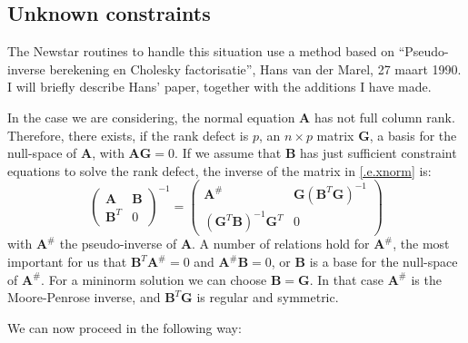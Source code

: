 \subsection{Unknown constraints}

The Newstar routines to handle this situation use a method based on
``Pseudo-inverse berekening en Cholesky factorisatie'', Hans van der Marel,
27 maart 1990. I will briefly describe Hans' paper, together with the
additions I have made.

In the case we are considering, the normal equation $\mathbf{A}$ has not full
column rank. Therefore, there exists, if the rank defect is $p$, an $n\times
p$ matrix $\mathbf{G}$, a basis for the null-space of $\mathbf{A}$, with
$\mathbf{AG}=0$. If we assume that $\mathbf{B}$ has just sufficient
constraint equations to solve the rank defect, the inverse of the matrix in
\eqref{.e.xnorm} is:
\begin{equation}
	{\left(\begin{array} {cc}
	      \mathbf{A} & \mathbf{B} \\
		\mathbf{B}^{T} & 0
	      \end{array} \right)}^{-1} =
	\left(\begin{array} {cc}
		\mathbf{A}^{\#} &
		\mathbf{G} {\left(\mathbf{B}^{T}\mathbf{G}\right)}^{-1} \\
		{\left(\mathbf{G}^{T}\mathbf{B}\right)}^{-1}\mathbf{G}^{T} & 0
	      \end{array}\right)
\end{equation}
with $\mathbf{A}^{\#}$ the pseudo-inverse of $\mathbf{A}$. A number of
relations hold for $\mathbf{A}^{\#}$, the most important for us that
$\mathbf{B}^{T}\mathbf{A}^{\#}=0$ and $\mathbf{A}^{\#}\mathbf{B}=0$, or
$\mathbf{B}$ is a base for the null-space of $\mathbf{A}^{\#}$. For a mininorm
solution we can choose $\mathbf{B}=\mathbf{G}$. In that case $\mathbf{A}^{\#}$
is the Moore-Penrose inverse, and $\mathbf{B}^{T}\mathbf{G}$ is regular and
symmetric.

We can now proceed in the following way:

